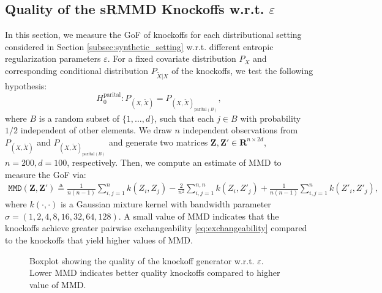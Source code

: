 \documentclass{article}
\theoremstyle{definition}
\begin{document}
\subsection{Quality of the sRMMD Knockoffs  w.r.t. \texorpdfstring{$\varepsilon$}{epsilon}}
In this section, we measure the GoF of knockoffs for each distributional setting considered in Section \ref{subsec:synthetic_setting} w.r.t. different entropic regularization parameters $\varepsilon$. For a fixed covariate distribution $P_X$ and corresponding conditional distribution $P_{\tilde X|X}$ of the knockoffs, we test the following hypothesis: 
\begin{equation*}
H_0^{\text{parital}}: P_{(X, \tilde X)} = P_{(X, \tilde X)_{\text{parital}(B)}},
\end{equation*}
where $B$ is a random subset of {\small $\{1, \dots, d\}$}, such that each $j\in B$ with probability $1/2$ independent of other elements.  We draw $n$ independent observations from $ P_{(X, \tilde X)}$ and $P_{(X, \tilde X)_{\text{parital}(B)}}$ and generate two matrices $\mathbf Z,\mathbf Z' \in \mathbf R^{n\times 2d}$, $n=200, d=100$, respectively. Then, we compute an estimate of MMD to measure the GoF via: 
\begin{align*}%
    \mathtt{MMD}(\mathbf Z, \mathbf Z') \triangleq  \frac{1}{n(n-1)}\sum_{i, j = 1}^{n} k(Z_i, Z_j)- \frac{2}{n^2}\sum_{i, j = 1}^{n, n} k( Z_i, Z'_j) + \frac{1}{n(n-1)}\sum_{i, j =1}^{n} k( Z'_i, Z'_j),
    \end{align*}
where $k(\cdot, \cdot)$ is a Gaussian mixture kernel with bandwidth parameter $\sigma =(1, 2, 4, 8, 16, 32, 64, 128)$. A small value of MMD indicates that the knockoffs achieve greater pairwise exchangeability \ref{eq:exchangeability} compared to the knockoffs that yield higher values of MMD.
\begin{figure}[H]
   \centering
   \caption{Boxplot showing the quality of the knockoff generator w.r.t.  $\varepsilon$. Lower MMD indicates better quality knockoffs compared to higher value of MMD.}
   \label{fig:quality_epsilon}
   \vspace{-4mm}
\end{figure}
\end{document}
